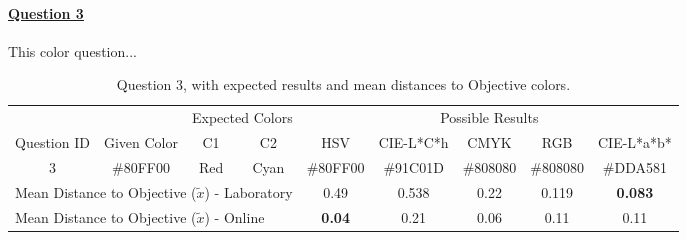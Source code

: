 \paragraph{\ul{Question 3}}
%
This color question...
%
\begin{table}[H]
  \resizebox{\textwidth}{!} {
  \begin{tabular}{@{}ccccccccc@{}}
    \toprule
                                  &                                                       & \multicolumn{2}{c}{Expected Colors}                   & \multicolumn{5}{c}{Possible Results}                                                                                                                                                                                                                                                  \\ \cmidrule(l){3-9}
    \multirow{-2}{*}{Question ID} & \multirow{-2}{*}{Given Color}                         & C1                       & C2                         & HSV                                                   & CIE-L*C*h                                             & CMYK                                                  & RGB                                                   & CIE-L*a*b*                                            \\ \midrule
    \multicolumn{1}{c|}{3}        & \multicolumn{1}{c|}{\cellcolor[HTML]{80FF00}\#80FF00} & \multicolumn{1}{c|}{Red} & \multicolumn{1}{c|}{Cyan} & \multicolumn{1}{c||}{\cellcolor[HTML]{80FF00}\#80FF00} & \multicolumn{1}{c||}{\cellcolor[HTML]{91C01D}\#91C01D} & \multicolumn{1}{c||}{\cellcolor[HTML]{808080}\#808080} & \multicolumn{1}{c||}{\cellcolor[HTML]{808080}\#808080} & \multicolumn{1}{c|}{\cellcolor[HTML]{DDA581}\#DDA581} \\ \midrule
    \multicolumn{4}{l}{Mean Distance to Objective ($\tilde{x}$) - Laboratory}                                                                                   & 0.49                                                  & 0.538                                                  & 0.22                                         & 0.119                                                  & \textbf{0.083}                                                  \\
    \multicolumn{4}{l}{Mean Distance to Objective ($\tilde{x}$) - Online}                                                                                   & \textbf{0.04}                                                  & 0.21                                                  & 0.06                                         & 0.11                                                  & 0.11                                                  \\ \bottomrule
    \end{tabular}}
  \caption[Question 3, with expected Results.]{Question 3, with expected results and mean distances to Objective colors.}
  \label{table:lab_q3_expected}
\end{table}
%
%
